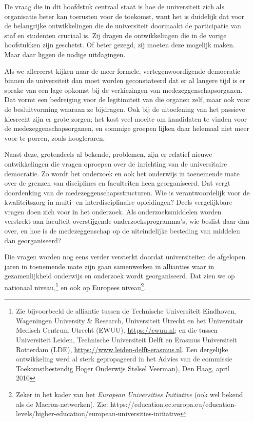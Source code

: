\documentclass[smallauthor, chapterhaspagenum, nochapterinheader, pagenuminheader,  bigchapnum,medium2, tocpages,  garamond, titleinheader]{jote-book}
\begin{document}
	De vraag die in dit hoofdstuk centraal staat is hoe de universiteit zich als organisatie beter kan toerusten voor de toekomst, want het is duidelijk dat voor de belangrijke ontwikkelingen die de universiteit doormaakt de participatie van staf en studenten cruciaal is. Zij dragen de ontwikkelingen die in de vorige hoofstukken zijn geschetst. Of beter gezegd, zij moeten deze mogelijk maken. Maar daar liggen de nodige uitdagingen.



	Als we allereerst kijken naar de meer formele, vertegenwoordigende democratie binnen de universiteit dan moet worden geconstateerd dat er al langere tijd is er sprake van een lage opkomst bij de verkiezingen van medezeggenschapsorganen. Dat vormt een bedreiging voor de legitimiteit van die organen zelf, maar ook voor de besluitvorming waaraan ze bijdragen. Ook bij de uitoefening van het passieve kiesrecht zijn er grote zorgen; het kost veel moeite om kandidaten te vinden voor de medezeggenschapsorganen, en sommige groepen lijken daar helemaal niet meer voor te porren, zoals hoogleraren.



	Naast deze, grotendeels al bekende, problemen, zijn er relatief nieuwe ontwikkelingen die vragen oproepen over de inrichting van de universitaire democratie. Zo wordt het onderzoek en ook het onderwijs in toenemende mate over de grenzen van disciplines en faculteiten heen georganiseerd. Dat vergt doordenking van de medezeggenschapsstructuren. Wie is verantwoordelijk voor de kwaliteitszorg in multi- en interdisciplinaire opleidingen? Deels vergelijkbare vragen doen zich voor in het onderzoek. Als onderzoeksmiddelen worden verstrekt aan faculteit overstijgende onderzoeksprogramma's, wie beslist daar dan over, en hoe is de medezeggenschap op de uiteindelijke besteding van middelen dan georganiseerd?



	Die vragen worden nog eens verder versterkt doordat universiteiten de afgelopen jaren in toenemende mate zijn gaan samenwerken in allianties waar in gezamenlijkheid onderwijs en onderzoek wordt georganiseerd. Dat zien we op nationaal niveau,\footnote{Zie bijvoorbeeld de alliantie tussen de Technische Universiteit Eindhoven, Wageningen University \& Research, Universiteit Utrecht en het Universitair Medisch Centrum Utrecht (EWUU), \href{https://www.leiden-delft-erasmus.nl}{https://ewuu.nl}; en die tussen Universiteit Leiden, Technische Universiteit Delft en Erasmus Universiteit Rotterdam (LDE), \href{https://ewuu.nl}{https://www.leiden-delft-erasmus.nl}. Een dergelijke ontwikkeling werd al sterk gepropageerd in het Advies van de commissie Toekomstbestendig Hoger Onderwijs Stelsel Veerman), Den Haag, april 2010} en ook op Europees niveau\footnote{Zeker in het kader van het \emph{European }\emph{Universities}\emph{ }\emph{Initiative} (ook wel bekend als de Macron-netwerken). Zie: https://education.ec.europa.eu/education-levels/higher-education/european-universities-initiative}.
\end{document}
